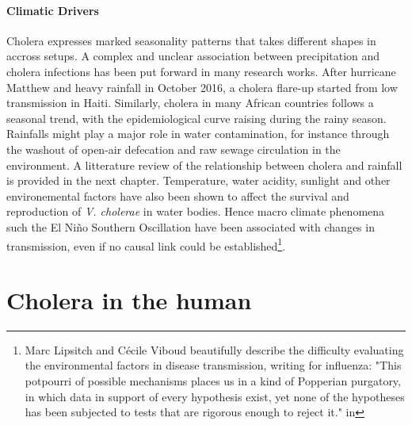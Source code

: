 \paragraph{Climatic Drivers} Cholera expresses marked seasonality patterns that takes different shapes in accross setups. A complex and unclear association between precipitation and cholera infections has been put forward in many research works. After hurricane Matthew and heavy rainfall in October 2016, a cholera flare-up started from low transmission in Haiti\cite{Pasetto:RealtimeForecastingCholera:2018}. Similarly, cholera in many African countries follows a seasonal trend, with the epidemiological curve raising during the rainy season\cite{Baracchini:SeasonalityCholeraDynamics:2017}.  Rainfalls might play a major role in water contamination, for instance through the washout of open-air defecation and raw sewage circulation in the environment. A litterature review of the relationship between cholera and rainfall is provided in the next chapter. Temperature, water acidity, sunlight and other environemental factors have also been shown to affect the survival and reproduction of \textit{V. cholerae} in water bodies. Hence macro climate phenomena such the El Niño Southern Oscillation have been associated with changes in transmission, even if no causal link could be established\cite{Pascual:CholeraDynamicsNinoSouthern:2000}\footnote{Marc Lipsitch and Cécile Viboud beautifully describe the difficulty evaluating the environmental factors in disease transmission, writing for influenza: "This potpourri of possible mechanisms places us in a kind of Popperian purgatory, in which data in support of every hypothesis exist, yet none of the hypotheses has been subjected to tests that are rigorous enough to reject it." in }.

\section{Cholera in the human} 
